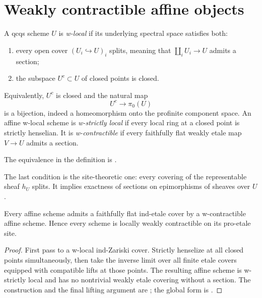 \section{Weakly contractible affine objects}

\begin{definition}
A qcqs scheme \(U\) is \emph{w-local} if its underlying spectral space
satisfies both:
\begin{enumerate}
\item every open cover \((U_i\hookrightarrow U)_i\) splits, meaning that
      \(\coprod_iU_i\to U\) admits a section;
\item the subspace \(U^c\subset U\) of closed points is closed.
\end{enumerate}
Equivalently, \(U^c\) is closed and the natural map
\[
  U^c\longrightarrow\pi_0(U)
\]
is a bijection, indeed a homeomorphism onto the profinite component space.
An affine w-local scheme is \emph{w-strictly local} if every local ring at a
closed point is strictly henselian.  It is \emph{w-contractible} if every
faithfully flat weakly etale map \(V\to U\) admits a section.
\end{definition}

The equivalence in the definition is
\cite[Definition~2.1.1 and Lemma~2.1.4]{BhattScholzeProEtale}.

The last condition is the site-theoretic one: every covering of the
representable sheaf \(h_U\) splits.  It implies exactness of sections on
epimorphisms of sheaves over \(U\).

\begin{theorem}
\label{thm:proetale-wcontractible-cover}
Every affine scheme admits a faithfully flat ind-etale cover by a
w-contractible affine scheme.  Hence every scheme is locally weakly
contractible on its pro-etale site.
\end{theorem}

\begin{proof}
First pass to a w-local ind-Zariski cover.  Strictly henselize at all closed
points simultaneously, then take the inverse limit over all finite etale
covers equipped with compatible lifts at those points.  The resulting affine
scheme is w-strictly local and has no nontrivial weakly etale covering without
a section.  The construction and the final lifting argument are
\cite[Lemma~2.4.9 and Proposition~4.2.8]{BhattScholzeProEtale}; the global
form is \cite[Theorem~1.5]{BhattScholzeProEtale}.
\end{proof}

